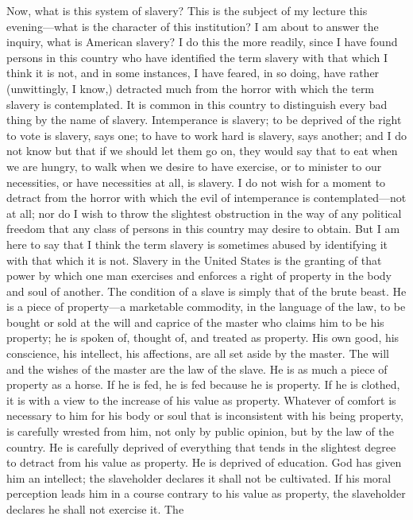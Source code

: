 {}Now, what is this system of slavery? This is the subject of my lecture
this evening---what is the character of this institution? I am about to
answer the inquiry, what is American slavery? I do this the more
readily, since I have found persons in this country who have identified
the term slavery with that which I think it is not, and in some
instances, I have feared, in so doing, have rather (unwittingly, I
know,) detracted much from the horror with which the term slavery is
contemplated. It is common in this country to distinguish every bad
thing by the name of slavery. Intemperance is slavery; to be deprived of
the right to vote is slavery, says one; to have to work hard is slavery,
says another; and I do not know but that if we should let them go on,
they would say that to eat when we are hungry, to walk when we desire to
have exercise, or to minister to our necessities, or have necessities at
all, is slavery. I do not wish for a moment to detract from the horror
with which the evil of intemperance is contemplated---not at all; nor do
I wish to throw the slightest obstruction in the way of any political
freedom that any class of persons in this country may desire to obtain.
But I am here to say that I think the term slavery is sometimes abused
by identifying it with that which it is not. Slavery in the United
States is the granting of that power by which one man exercises and
enforces a right of property in the body and soul of another. The
condition of a slave is simply that of the brute beast. He is a piece of
property---a marketable commodity, in the language of the law, to be
bought or sold at the will and caprice of the master who claims him to
be his property; he is spoken of, thought of, and treated as property.
His own good, his conscience, his intellect, his affections, are all set
aside by the master. The will and the wishes of the master are the law
of the slave. He is as much a piece of property as a horse. If he is
fed, he is fed because he is property. If he is clothed, it is with a
view to the increase of his value as property. Whatever of comfort is
necessary to him for his body or soul that is inconsistent with his
being property, is carefully wrested from him, not only by public
opinion, but by the law of the country. He is carefully deprived of
everything that tends in the slightest degree to detract from his value
as property. He is deprived of education. God has given him an
intellect; the slaveholder declares it shall not be cultivated. If his
moral perception leads him in a course contrary to his value as
{}property, the slaveholder declares he shall not exercise it. The
